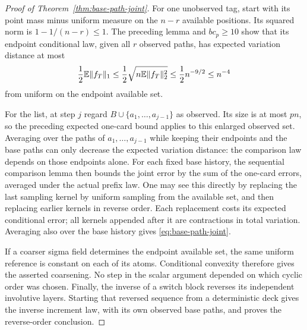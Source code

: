 \begin{proof}[Proof of Theorem~\ref{thm:base-path-joint}]
For one unobserved tag, start with its point mass minus uniform measure
on the $n-r$ available positions. Its squared norm is $1-1/(n-r)\le1$.
The preceding lemma and $bc_p\ge10$ show that its endpoint conditional
law, given all $r$ observed paths, has expected variation distance at
most
\[
 \frac12\mathbb E\|f_T\|_1
 \le\frac12\sqrt{n\mathbb E\|f_T\|_2^2}
 \le\frac12 n^{-9/2}\le n^{-4}
\]
from uniform on the endpoint available set.

For the list, at step $j$ regard $B\cup\{a_1,\ldots,a_{j-1}\}$
as observed. Its size is at most $pn$, so the preceding expected
one-card bound applies to this enlarged observed set. Averaging over the paths of
$a_1,\ldots,a_{j-1}$ while keeping their endpoints and the base
paths can only decrease the expected variation distance: the comparison
law depends on those endpoints alone. For each fixed base history,
the sequential comparison lemma then bounds the joint error by the
sum of the one-card errors, averaged under the actual prefix law.
One may see this directly by replacing the last sampling kernel by
uniform sampling from the available set, and then replacing earlier
kernels in reverse order. Each replacement costs its expected
conditional error; all kernels appended after it are contractions
in total variation. Averaging also over the base history gives
\eqref{eq:base-path-joint}.

If a coarser sigma field determines the endpoint available set, the
same uniform reference is constant on each of its atoms. Conditional
convexity therefore gives the asserted coarsening. No step in the
scalar argument depended on which cyclic order was chosen. Finally,
the inverse of a switch block reverses its independent involutive
layers. Starting that reversed sequence from a deterministic deck gives
the inverse increment law, with its own observed base paths, and proves
the reverse-order conclusion.
\end{proof}
